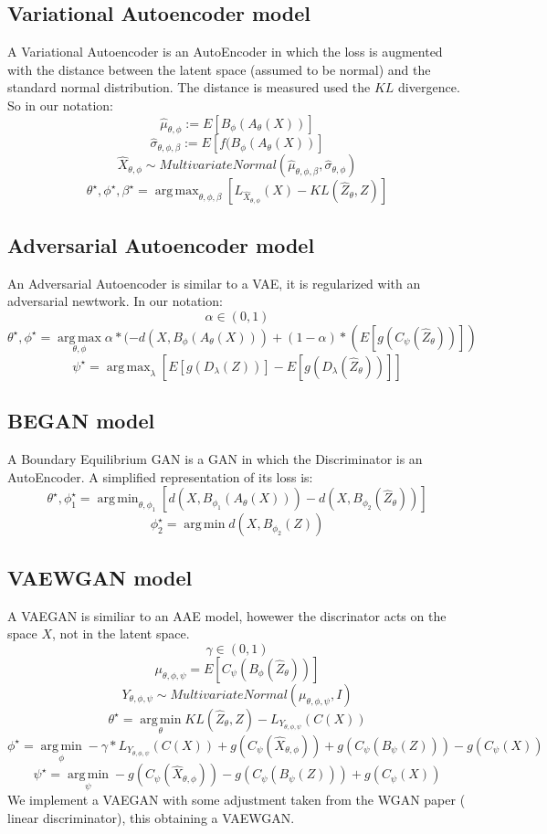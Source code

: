 \documentclass{article}
\DeclareMathOperator*{\argmax}{arg\,max}
\DeclareMathOperator*{\argmin}{arg\,min}
\begin{document}
\subsection{Variational Autoencoder model}
A Variational Autoencoder \cite{varauto} is an AutoEncoder in which the loss is augmented with the distance between the latent space (assumed to be normal) and the standard normal distribution. The distance is measured used the $KL$ divergence.\\
So in our notation:\\
$$\hat{\mu}_{\theta,\phi}:= E[B_{\phi}(A_{\theta}(X))]$$
$$\hat{\sigma}_{\theta,\phi,\beta}:=E[f(B_{\phi}(A_{\theta}(X))]$$
$$\hat{X}_{\theta,\phi}\sim MultivariateNormal(\hat{\mu}_{\theta,\phi,\beta},\hat{\sigma}_{\theta,\phi})$$
$$\theta^{\star},\phi^{\star},\beta^{\star}=\argmax_{\theta,\phi,\beta}[L_{\hat{X}_{\theta,\phi}}(X)-KL(\hat{Z}_{\theta},Z)]$$



\subsection{Adversarial Autoencoder model}
An Adversarial Autoencoder \cite{aae} is similar to a VAE, it is regularized with an adversarial newtwork. In our notation:
$$\alpha\in (0,1)$$
$$\theta^{\star},\phi^{\star}=\argmax\limits_{\theta,\phi}\alpha*(-d(X,B_{\phi}(A_{\theta}(X)))+(1-\alpha)*(E[g(C_{\psi}(\hat{Z}_{\theta}))])$$
$$\psi^{\star}=\argmax_{\lambda}  [E[g(D_{\lambda}(Z))]-E[g(D_{\lambda}(\hat{Z}_{\theta}))]]
$$


\subsection{BEGAN model}
A Boundary Equilibrium GAN \cite{began} is a GAN in which the Discriminator is an AutoEncoder. A simplified representation of its loss is:
$$\theta^{\star},\phi_{1}^{\star}=\argmin_{\theta,\phi_{1}}[ d(X,B_{\phi_{1}}(A_{\theta}(X)))-d(X,B_{\phi_{2}}(\hat{Z}_{\theta}))]$$
$$\phi_{2}^{\star}=\argmin d(X,B_{\phi_{2}}(Z))$$
\subsection{VAEWGAN model}
A VAEGAN \cite{vaegan} is similiar to an AAE model, howewer the discrinator acts on the space $X$, not in the latent space.
$$\gamma \in (0,1)$$
$$\mu_{\theta,\phi,\psi}=E[C_{\psi}(B_{\phi}(\hat{Z}_{\theta}))]$$
$$Y_{\theta,\phi,\psi}\sim MultivariateNormal(\mu_{\theta,\phi,\psi},I)$$
$$\theta^{\star}=\argmin\limits_{\theta} KL(\hat{Z}_{\theta},Z)-L_{Y_{\theta,\phi,\psi}}(C(X))$$
$$\phi^{\star}= \argmin\limits_{\phi} -\gamma*L_{Y_{\theta,\phi,\psi}}(C(X))+g(C_{\psi}(\hat{X}_{\theta,\phi}))+g(C_{\psi}(B_{\psi}(Z)))-g(C_{\psi}(X))$$
$$\psi^{\star}=\argmin\limits_{\psi}- g(C_{\psi}(\hat{X}_{\theta,\phi}))-g(C_{\psi}(B_{\psi}(Z)))+g(C_{\psi}(X))$$
We implement a VAEGAN with some adjustment taken from the WGAN paper\cite{wgan} ( linear discriminator), this obtaining a VAEWGAN.  
\end{document}

